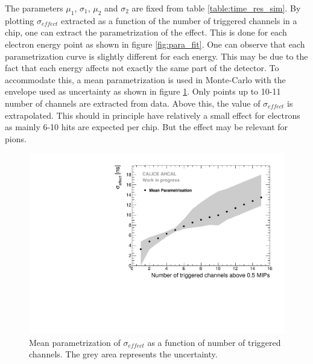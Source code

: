The parameters $\mu_1$, $\sigma_1$, $\mu_2$ and $\sigma_2$ are fixed from table \ref{table:time_res_sim}. By plotting $\sigma_{effect}$ extracted as a function of the number of triggered channels in a chip, one can extract the parametrization of the effect. This is done for each electron energy point as shown in figure \ref{fig:para_fit}. One can observe that each parametrization curve is slightly different for each energy. This may be due to the fact that each energy affects not exactly the same part of the detector. To accommodate this, a mean parametrization is used in Monte-Carlo with the envelope used as uncertainty as shown in figure \ref{fig:mean_para}. Only points up to 10-11 number of channels are extracted from data. Above this, the value of $\sigma_{effect}$ is extrapolated. This should in principle have relatively a small effect for electrons as mainly 6-10 hits are expected per chip. But the effect may be relevant for pions.

\begin{figure}[htbp!]
	\centering
	\includegraphics[width=0.7\linewidth]{../Thesis_Plots/Timing/Electrons/Plots/MeanParametrisationWithSystErrors.pdf}
	\caption{Mean parametrization of $\sigma_{effect}$ as a function of number of triggered channels. The grey area represents the uncertainty.}
	\label{fig:mean_para}
\end{figure}
